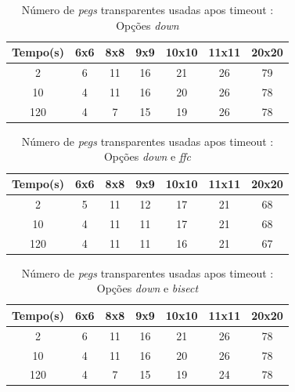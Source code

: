 \documentclass{llncs}
\begin{document}
\setlength{\tabcolsep}{12pt}
\begin{table}[ht] 
\caption{N\'{u}mero de \emph{pegs} transparentes usadas apos timeout : Op\c{c}\~{o}es \emph{down}} %
\centering %
\begin{tabular}{c c c c c c c} %
\hline\hline %

Tempo(s) & 6x6 & 8x8 & 9x9 & 10x10 & 11x11 & 20x20\\ [0.5ex] %
\hline %
2 & 6 & 11 & 16 & 21 & 26 & 79 \\
10 & 4 & 11 & 16 & 20 & 26 & 78 \\
120 & 4 & 7 & 15 & 19 & 26 & 78 \\[1 ex]
\hline %
\end{tabular} 
\label{tabela:6} %
\end{table}


\setlength{\tabcolsep}{12pt}
\begin{table}[ht] 
\caption{N\'{u}mero de \emph{pegs} transparentes usadas apos timeout : Op\c{c}\~{o}es \emph{down} e \emph{ffc}} %
\centering %
\begin{tabular}{c c c c c c c} %
\hline\hline %

Tempo(s) & 6x6 & 8x8 & 9x9 & 10x10 & 11x11 & 20x20\\ [0.5ex] %
\hline %
2 & 5 & 11 & 12 & 17 & 21 & 68 \\
10 & 4 & 11 & 11 & 17 & 21 & 68 \\
120 & 4 & 11 & 11 & 16 & 21 & 67 \\[1 ex]
\hline %
\end{tabular} 
\label{tabela:7} %
\end{table}


\setlength{\tabcolsep}{12pt}
\begin{table}[ht!] 
\caption{N\'{u}mero de \emph{pegs} transparentes usadas apos timeout : Op\c{c}\~{o}es \emph{down} e \emph{bisect}} %
\centering %
\begin{tabular}{c c c c c c c} %
\hline\hline %

Tempo(s) & 6x6 & 8x8 & 9x9 & 10x10 & 11x11 & 20x20\\ [0.5ex] %
\hline %
2 & 6 & 11 & 16 & 21 & 26 & 78 \\
10 & 4 & 11 & 16 & 20 & 26 & 78 \\
120 & 4 & 7 & 15 & 19 & 24 & 78 \\[1 ex]
\hline %
\end{tabular} 
\label{tabela:8} %
\end{table}
\end{document}
